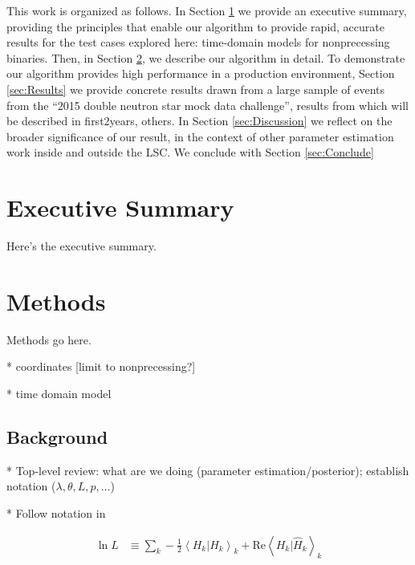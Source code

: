 \documentclass[twocolumn,prd,nofootinbib]{revtex4}
\newcommand\editremark[1]{{\color{red} #1}}
\newcommand\qmstateproduct[2]{\left\langle#1|#2\right\rangle}
\begin{document}
This work is organized as follows.
In Section \ref{sec:Executive} we provide an executive summary, providing the principles that enable our algorithm to
provide rapid, accurate results for the test cases explored here:  time-domain models for nonprecessing binaries.  
%
Then, in Section \ref{sec:Methods}, we describe our algorithm in detail.  
%
To demonstrate  our algorithm provides high performance in a production environment,  Section \ref{sec:Results} we
provide concrete results drawn from a large sample of events from the ``2015 double neutron star mock data challenge'',
results from which will be described in \editremark{first2years, others}.  
%
In Section \ref{sec:Discussion} we reflect on the broader significance of our result, in the context of other parameter
estimation work inside and outside the LSC.  
%
We conclude with Section \ref{sec:Conclude}

 

\section{Executive Summary}
\label{sec:Executive}

Here's the executive summary.

\section{Methods}
\label{sec:Methods}

Methods go here.

* coordinates [limit to nonprecessing?]

* time domain model


\subsection{Background}

* Top-level review: what are we doing (parameter estimation/posterior); establish notation ($\lambda,\theta,L,p,\ldots$)

* Follow notation in \cite{gwastro-mergers-HeeSuk-FisherMatrixWithAmplitudeCorrections,gwastro-mergers-HeeSuk-CompareToPE-Aligned}


\begin{widetext}
\begin{align}
\label{eq:def:LikelihoodRatio}
\ln L &\equiv  \sum_k  -\frac{1}{2} \qmstateproduct{H_k}{H_k}_k +  \text{Re} \qmstateproduct{H_k}{\hat{H}_k}_k 
\end{align}
\end{widetext}
\end{document}
